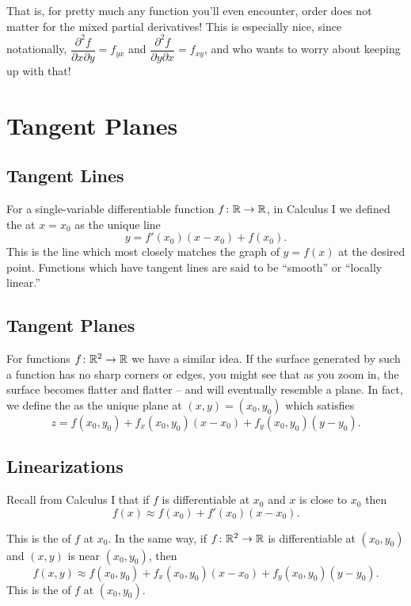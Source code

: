 That is, for pretty much any function you’ll even encounter, order does not matter for the mixed partial derivatives! This is especially nice, since notationally, \(\dfrac{\partial^{2} f}{\partial x \partial y} = f_{yx}\) and \(\dfrac{\partial^{2} f}{\partial y \partial x} = f_{xy}\), and who wants to worry about keeping up with that!

\newpage

\setcounter{section}{3}

\section{Tangent Planes}

\subsection{Tangent Lines}

For a single-variable differentiable function \(f \colon \mathbb{R} \to \mathbb{R}\), in Calculus I we defined the  at \(x = x_{0}\) as the unique line
\[
y = f'(x_{0})(x - x_{0}) + f(x_{0}).
\]
This is the line which most closely matches the graph of \(y = f(x)\) at the desired point. Functions which have tangent lines are said to be “smooth” or “locally linear.”

\subsection{Tangent Planes}

For functions \(f \colon \mathbb{R}^{2} \to \mathbb{R}\) we have a similar idea. If the surface generated by such a function has no sharp corners or edges, you might see that as you zoom in, the surface becomes flatter and flatter – and will eventually resemble a plane. In fact, we define the  as the unique plane at \((x, y) = (x_{0}, y_{0})\) which satisfies
\[
z = f(x_{0}, y_{0}) + f_{x}(x_{0}, y_{0})(x - x_{0}) + f_{y}(x_{0}, y_{0})(y - y_{0}).
\]

\subsection{Linearizations}

Recall from Calculus I that if \(f\) is differentiable at \(x_{0}\) and \(x\) is close to \(x_{0}\) then
\[
f(x) \approx f(x_{0}) + f'(x_{0})(x - x_{0}).
\]

This is the  of \(f\) at \(x_{0}\). In the same way, if \(f \colon \mathbb{R}^{2} \to \mathbb{R}\) is differentiable at \((x_{0}, y_{0})\) and \((x, y)\) is near \((x_{0}, y_{0})\), then
\[
f(x, y) \approx f(x_{0}, y_{0}) + f_{x}(x_{0}, y_{0})(x - x_{0}) + f_{y}(x_{0}, y_{0})(y - y_{0}).
\]
This is the  of \(f\) at \((x_{0}, y_{0})\).